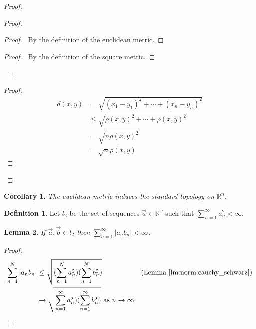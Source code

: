 \documentclass{report}
\let\qed\relax
\newtheorem{lm}{Lemma}[section]
\newtheorem{cor}{Corollary}[lm]
\theoremstyle{definition}
\newtheorem{df}[lm]{Definition}
\begin{document}
  \begin{proof}
    \pf
    \begin{proof}
      \begin{proof}
        \pf\ By the definition of the euclidean metric.
      \end{proof}
      \qedstep
      \begin{proof}
        \pf\ By the definition of the square metric.
      \end{proof}
    \end{proof}
    \begin{proof}
      \pf
      \begin{align*}
        d(x, y) & = \sqrt{(x_1 - y_1)^2 + \cdots + (x_n - y_n)^2} \\
        & \leq \sqrt{\rho(x,y)^2 + \cdots + \rho(x, y)^2} \\
        & = \sqrt{n \rho(x,y)^2} \\
        & = \sqrt{n} \rho(x, y)
      \end{align*}
    \end{proof}
    \qed
  \end{proof}

  \begin{cor}
    The euclidean metric induces the standard topology on $\mathbb{R}^n$.
  \end{cor}

  \begin{df}
    Let $l_2$ be the set of sequences $\vec{a} \in \mathbb{R}^\omega$ such that
    $\sum_{n=1}^\infty a_n^2 < \infty$.
  \end{df}

  \begin{lm}
    \label{lm:norm:l2}
    If $\vec{a}, \vec{b} \in l_2$ then $\sum_{n=1}^\infty |a_n b_n| < \infty$.
  \end{lm}

  \begin{proof}
    \pf
    \begin{align*}
      \sum_{n=1}^N |a_n b_n| & \leq \sqrt{(\sum_{n=1}^N a_n^2) (\sum_{n=1}^N
        b_n^2)} & (\text{Lemma \ref{lm:norm:cauchy_schwarz}}) \\
      & \rightarrow \sqrt{\sum_{n=1}^\infty a_n^2) (\sum_{n=1}^\infty b_n^2)}
      \text{ as } n \rightarrow \infty
    \end{align*}
    \qed
  \end{proof}
\end{document}

